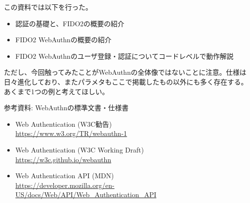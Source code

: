 \documentclass[12pt,dvipdfmx,uplatex]{beamer}
\begin{document}
\begin{frame}
この資料では以下を行った。
\begin{itemize}
 \item 認証の基礎と、FIDO2の概要の紹介
 \item FIDO2 WebAuthnの概要の紹介
 \item FIDO2 WebAuthnのユーザ登録・認証についてコードレベルで動作解説
\end{itemize}

ただし、今回触ってみたことがWebAuthnの全体像ではないことに注意。仕様は日々進化しており、またパラメタもここで掲載したもの以外にも多く存在する。あくまで1つの例と考えてほしい。
\end{frame}


\begin{frame}{参考資料: WebAuthnの標準文書・仕様書}
\small
\begin{itemize}
 \item Web Authentication (W3C勧告)\\ \url{https://www.w3.org/TR/webauthn-1}
 \item Web Authentication (W3C Working Draft)\\ \url{https://w3c.github.io/webauthn}
 \item Web Authentication API (MDN)\\ \url{https://developer.mozilla.org/en-US/docs/Web/API/Web_Authentication_API}
\end{itemize}
\end{frame}




 

\end{document}
